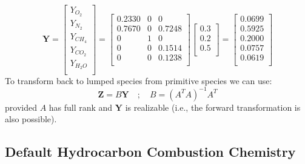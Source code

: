 \begin{equation}\label{eq:transform_to_primitive}
\mathbf{Y}=\left[\begin{array}{c}
       Y_{O_2} \\
       Y_{N_2} \\
       Y_{CH_4} \\
       Y_{CO_2} \\
       Y_{H_2O} \\
     \end{array}\right]
     =\left[\begin{array}{ccc}
     0.2330 & 0 & 0 \\
     0.7670 & 0 & 0.7248 \\
     0 & 1 & 0 \\
     0 & 0 & 0.1514 \\
     0 & 0 & 0.1238 \\
     \end{array}\right]
     \left[\begin{array}{c}
     0.3 \\
     0.2 \\
     0.5 \\
     \end{array}\right]
     =\left[\begin{array}{c}
     0.0699\\
     0.5925\\
     0.2000\\
     0.0757\\
     0.0619\\
     \end{array}\right]
\end{equation}
To transform back to lumped species from primitive species we can use:
\begin{equation}\label{eq:transform_back}
\textbf{Z}=B\textbf{Y} \quad ; \quad B=(A^TA)^{-1}A^T
\end{equation}
provided $A$ has full rank and $\mathbf{Y}$ is realizable (i.e., the forward transformation is also possible).

\subsection{Default Hydrocarbon Combustion Chemistry}
\label{sec:simplechemistry}

